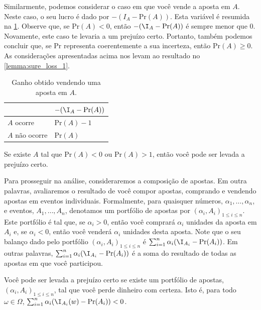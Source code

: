 Similarmente, podemos considerar o caso em que 
você vende a aposta em $A$.
Neste caso, o seu lucro é dado por 
$-(I_{A}-\text{Pr}(A))$.
Esta variável é resumida na \cref{table:aposta_vender}.
Observe que, se $\text{Pr}(A) < 0$, 
então $-(\I_{A}-\text{Pr}(A))$ é sempre menor que $0$.
Novamente, este caso te levaria a um prejuízo certo.
Portanto, também podemos concluir que,
se $\text{Pr}$ representa coerentemente a sua incerteza,
então $\text{Pr}(A) \geq 0$.
As considerações apresentadas acima 
nos levam ao resultado no \cref{lemma:sure_loss_1}.

\begin{table}
 \centering
 \begin{tabular}{|l|l|}
 \hline
  & $-(\I_{A}-\text{Pr}(A))$ \\
  \hline
  $A$ ocorre & $\text{Pr}(A)-1$ \\
  $A$ não ocorre & $\text{Pr}(A)$ \\
  \hline
 \end{tabular}
 \caption{Ganho obtido vendendo uma aposta em $A$.}
 \label{table:aposta_vender}
\end{table}

\begin{lemma}
 \label{lemma:sure_loss_1}
 Se existe $A$ tal que $\text{Pr}(A) < 0$ ou
 $\text{Pr}(A) > 1$, então 
 você pode ser levada a prejuízo certo.
\end{lemma}

Para prosseguir na análise,
consideraremos a composição de apostas.
Em outra palavras, avaliaremos o resultado
de você compor apostas, comprando e 
vendendo apostas em eventos individuais.
Formalmente, para quaisquer números,
$\alpha_{1}, \ldots, \alpha_{n}$,
e eventos, $A_{1}, \ldots, A_{n}$,
denotamos um portfólio de apostas por $(\alpha_{i},A_{i})_{1 \leq i \leq n}$.
Este portfólio é tal que,
se $\alpha_{i} > 0$, então você 
comprará $\alpha_{i}$ unidades da aposta em $A_{i}$ e,
se $\alpha_{i} < 0$, então você 
venderá $\alpha_{i}$ unidades desta aposta.
Note que o seu balanço dado pelo portfólio $(\alpha_{i},A_{i})_{1 \leq i \leq n}$ é 
$\sum_{i=1}^{n}{\alpha_{i}(\I_{A_{i}}-\text{Pr}(A_{i}))}$.
Em outras palavras, $\sum_{i=1}^{n}{\alpha_{i}(\I_{A_{i}}-\text{Pr}(A_{i}))}$ é 
a soma do resultado de todas as apostas 
em que você participou.

\begin{definition}
 Você pode ser levada a prejuízo certo se 
 existe um portfólio de apostas,
 $(\alpha_{i},A_{i})_{1 \leq i \leq n}$,
 tal que você perde dinheiro com certeza. 
 Isto é, para todo $\omega \in \Omega$,
 $\sum_{i=1}^{n}{\alpha_{i}(\I_{A_{i}}(w)-\text{Pr}(A_{i}))} < 0$.
\end{definition}

